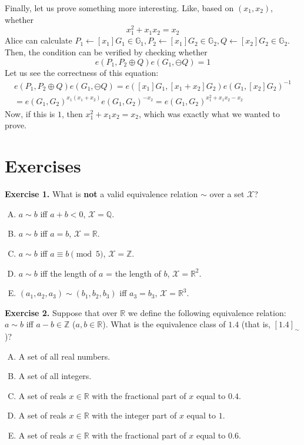 \documentclass[../lecture-notes.tex]{subfiles}
\begin{document}
\begin{example}
    Finally, let us prove something more interesting. Like, based on $(x_1,x_2)$, whether
    \begin{equation}
        x_1^2 + x_1x_2 = x_2
    \end{equation}
    Alice can calculate $P_1 \gets [x_1]G_1 \in \mathbb{G}_1, P_2 \gets [x_1]G_2 \in \mathbb{G}_2, Q \gets [x_2]G_2 \in \mathbb{G}_2$. Then, the condition can be verified by checking whether
    \begin{equation}
        e(P_1,P_2\oplus Q)e(G_1,\ominus Q) = 1
    \end{equation}
    Let us see the correctness of this equation:
    \begin{gather}
        e(P_1,P_2\oplus Q)e(G_1,\ominus Q) = e([x_1]G_1,[x_1+x_2]G_2)e(G_1,[x_2]G_2)^{-1} \nonumber \\= e(G_1,G_2)^{x_1(x_1+x_2)}e(G_1,G_2)^{-x_2} = e(G_1,G_2)^{x_1^2+x_1x_2-x_2}
    \end{gather}
    Now, if this is $1$, then $x_1^2+x_1x_2=x_2$, which was exactly what we wanted to prove.
\end{example}

\section{Exercises}

\textbf{Exercise 1.} What is \textbf{not} a valid equivalence relation $\sim$ over a set $\mathcal{X}$?
\begin{enumerate}[(A)]
    \item $a \sim b$ iff $a+b < 0$, $\mathcal{X} = \mathbb{Q}$.
    \item $a\sim b$ iff $a=b$, $\mathcal{X} = \mathbb{R}$.
    \item $a\sim b$ iff $a \equiv b \pmod{5}$, $\mathcal{X} = \mathbb{Z}$.
    \item $a\sim b$ iff the length of $a$ = the length of $b$, $\mathcal{X} = \mathbb{R}^2$.
    \item $(a_1,a_2,a_3)\sim (b_1,b_2,b_3)$ iff $a_3=b_3$, $\mathcal{X} = \mathbb{R}^3$.
\end{enumerate}

\textbf{Exercise 2.} Suppose that over $\mathbb{R}$ we define the following equivalence relation: $a \sim b$ iff $a-b \in \mathbb{Z}$ ($a,b \in \mathbb{R}$). What is the equivalence class of $1.4$ (that is, $[1.4]_{\sim}$)?
\begin{enumerate}[(A)]
    \item A set of all real numbers.
    \item A set of all integers.
    \item A set of reals $x \in \mathbb{R}$ with the fractional part of $x$ equal to $0.4$.
    \item A set of reals $x \in \mathbb{R}$ with the integer part of $x$ equal to $1$.
    \item A set of reals $x \in \mathbb{R}$ with the fractional part of $x$ equal to $0.6$.
\end{enumerate}
\end{document}
